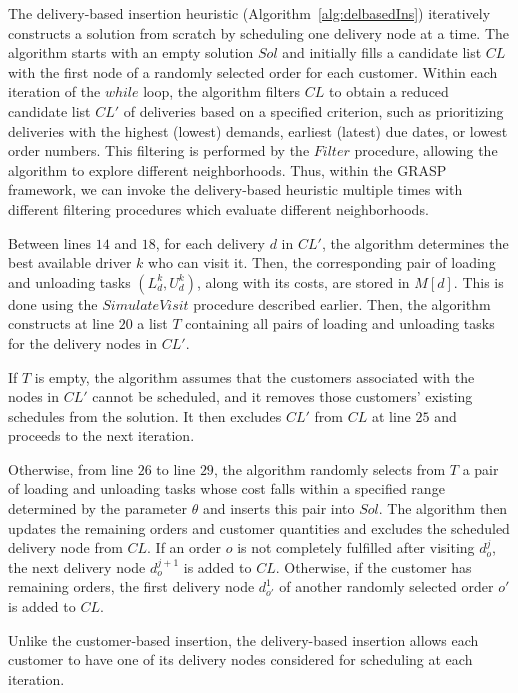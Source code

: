 \documentclass{article}
\begin{document}
The delivery-based insertion heuristic (Algorithm~\ref{alg:delbasedIns}) iteratively constructs a solution from scratch by scheduling one delivery node at a time. The algorithm starts with an empty solution $Sol$ and initially fills a candidate list $CL$ with the first node of a randomly selected order for each customer. Within each iteration of the $while$ loop, the algorithm filters $CL$ to obtain a reduced candidate list $CL'$ of deliveries based on a specified criterion, such as prioritizing deliveries with the highest (lowest) demands, earliest (latest) due dates, or lowest order numbers. This filtering is performed by the $Filter$ procedure, allowing the algorithm to explore different neighborhoods. Thus, within the GRASP framework, we can invoke the delivery-based heuristic multiple times with different filtering procedures which evaluate different neighborhoods. 

Between lines $14$ and $18$, for each delivery $d$ in $CL'$, the algorithm determines the best available driver $k$ who can visit it. Then, the corresponding pair of loading and unloading tasks $(L^k_d, U^k_d)$, along with its costs, are stored in $M[d]$. This is done using the $SimulateVisit$ procedure described earlier. Then, the algorithm constructs at line $20$ a list $T$ containing all pairs of loading and unloading tasks for the delivery nodes in $CL'$.

If $T$ is empty, the algorithm assumes that the customers associated with the nodes in $CL'$ cannot be scheduled, and it removes those customers' existing schedules from the solution. It then excludes $CL'$ from $CL$ at line $25$ and proceeds to the next iteration.

Otherwise, from line $26$ to line $29$, the algorithm randomly selects from $T$ a pair of loading and unloading tasks whose cost falls within a specified range determined by the parameter $\theta$ and inserts this pair into $Sol$. The algorithm then updates the remaining orders and customer quantities and excludes the scheduled delivery node from $CL$. If an order $o$ is not completely fulfilled after visiting $d^j_{o}$, the next delivery node $d^{j+1}_{o}$ is added to $CL$.  Otherwise, if the customer has remaining orders, the first delivery node $d^{1}_{o'}$ of another randomly selected order $o'$ is added to $CL$.

Unlike the customer-based insertion, the delivery-based insertion allows each customer to have one of its delivery nodes considered for scheduling at each iteration.
 
\end{document}
